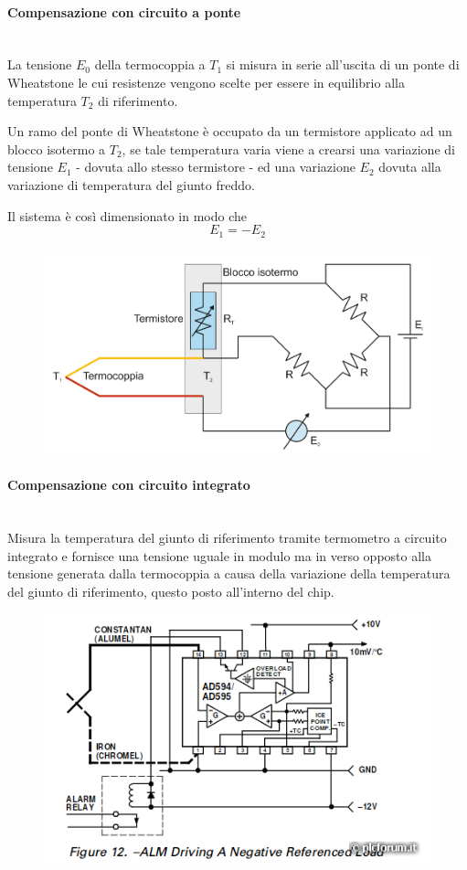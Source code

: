 \documentclass[a4paper, 15pt]{article}
\begin{document}
\begin{adjustwidth}{2in}{}
	 \paragraph{Compensazione con circuito a ponte} \mbox{} \\
	 La tensione $E_0$ della termocoppia a $T_1$ si misura in serie all'uscita di un ponte di Wheatstone le cui resistenze vengono scelte per essere in equilibrio alla temperatura $T_2$ di riferimento. 
	 
	 Un ramo del ponte di Wheatstone è occupato da un termistore applicato ad  un blocco isotermo a $T_2$, se tale temperatura varia viene a crearsi una variazione di tensione $E_1$ - dovuta allo stesso termistore - ed una variazione $E_2$  dovuta alla variazione di temperatura del giunto freddo.
	 
	 Il sistema è così dimensionato in modo che 
	 \[E_1=-E_2\]
	 \begin{figure}[H]
	 	\centering
	 	\includegraphics[width=0.5\linewidth]{immagini/screenshot029}
	 	\label{fig:screenshot029}
	 \end{figure}
	 
	 
	 \paragraph{Compensazione con circuito integrato} \mbox{} \\
	  Misura la temperatura del giunto di riferimento tramite termometro a circuito integrato e fornisce una tensione uguale in modulo ma in verso opposto alla  tensione generata dalla termocoppia a causa della variazione della temperatura del giunto di riferimento, questo posto all'interno del chip.	  
	  \begin{figure}[H]
	  	\centering
	  	\includegraphics[width=0.5\linewidth]{immagini/screenshot030}
	  	\label{fig:screenshot030}
	  \end{figure}
\end{adjustwidth}
\newpage
\end{document}
